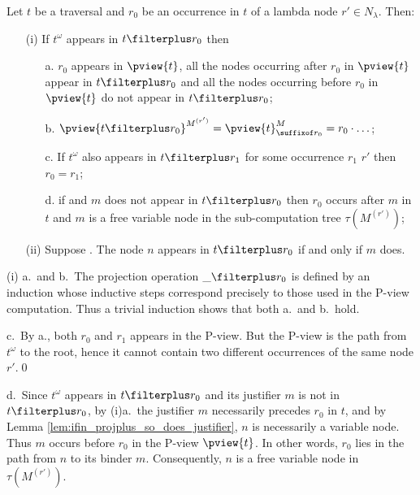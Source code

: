 \begin{lemma}
\label{lem:pviewproj_traversal} Let $t$ be a traversal and
$r_0$ be an occurrence in $t$ of a lambda node $r' \in N_\lambda$. Then:
\begin{itemize}
\item[(i)] If $t^\omega$ appears in $t\filterplus r_0$ then
    \begin{itemize}
    \item[a.] $r_0$ appears in $\pview{t}$, all the nodes occurring after $r_0$ in $\pview{t}$ appear in $t\filterplus r_0$
    and all the nodes occurring before $r_0$ in $\pview{t}$ do not appear in $t\filterplus r_0$;

    \item[b.] $\pview{t\filterplus r_0}^{M^{(r')}} = \pview{t}^M_{\suffixof r_0} = r_0\cdot \ldots$; %

    \item[c.] If $t^\omega$ also appears in $t\filterplus r_1$ for some occurrence $r_1$ $r'$ then $r_0 = r_1$;

    \item[d.] if  and $m$ does not appear in $t\filterplus r_0$ then
    $r_0$ occurs after $m$ in $t$ and $m$ is a free variable
    node in the sub-computation tree $\tau(M^{(r')})$;
    \end{itemize}
\item[(ii)] Suppose . The node  $n$ appears in $t\filterplus r_0$ if and only if $m$ does.
\end{itemize}
\end{lemma}
\proof (i) a.\ and b.\  The projection operation $\_ \filterplus r_0$ is
defined by an induction whose inductive steps correspond precisely
to those used in the P-view computation. Thus a trivial induction
shows that both a.\ and b.\ hold.

c.\ By a., both $r_0$ and $r_1$ appears in the P-view. But the
P-view is the path from $t^\omega$ to the root, hence it cannot
contain two different occurrences of the same node $r'$.\qed

d.\ Since $t^\omega$ appears in $t\filterplus r_0$ and its justifier
$m$ is not in $t\filterplus r_0$, by (i)a.\ the justifier $m$
necessarily precedes $r_0$ in $t$, and by Lemma
\ref{lem:ifin_projplus_so_does_justifier}, $n$ is necessarily a variable node.
Thus $m$ occurs before $r_0$ in the P-view $\pview{t}$. In other words, $r_0$ lies in the path from
$n$ to its binder $m$. Consequently, $n$ is a free variable node in
$\tau(M^{(r')})$.


